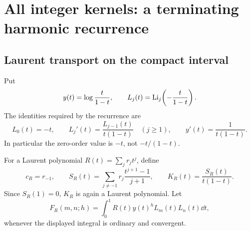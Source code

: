 \section{All integer kernels: a terminating harmonic recurrence}
\label{bmh:sec:kernels}

\subsection{Laurent transport on the compact interval}
Put
\[
 y(t)=\log\frac{t}{1-t},\qquad
 L_j(t)=\operatorname{Li}_j\!\left(-\frac{t}{1-t}\right).
\]
The identities required by the recurrence are
\begin{equation}\label{bmh:eq:Lderivative}
 L_0(t)=-t,\qquad
 L_j'(t)=\frac{L_{j-1}(t)}{t(1-t)}\quad(j\ge1),\qquad
 y'(t)=\frac1{t(1-t)}.
\end{equation}
In particular the zero-order value is $-t$, not $-t/(1-t)$.

For a Laurent polynomial $R(t)=\sum_jr_jt^j$, define
\begin{equation}\label{bmh:eq:SR}
 c_R=r_{-1},\qquad
 S_R(t)=\sum_{j\ne-1}r_j\frac{t^{j+1}-1}{j+1},\qquad
 K_R(t)=\frac{S_R(t)}{t(1-t)}.
\end{equation}
Since $S_R(1)=0$, $K_R$ is again a Laurent polynomial. Let
\[
 F_R(m,n;h)=\int_0^1 R(t)y(t)^h L_m(t)L_n(t)\dd t,
\]
whenever the displayed integral is ordinary and convergent.

